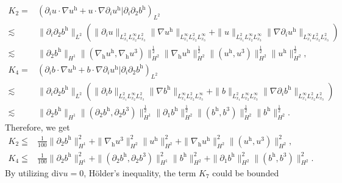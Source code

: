 \documentclass[11pt]{amsart}
\theoremstyle{definition}
\newcommand{\h}{\mathrm{h}}
\newcommand{\nablah}{\nabla_{\mathrm{h}}}
\numberwithin{equation}{section}
\begin{document}
\begin{align}\label{k_2}
	K_2=&\left(\partial_{i}u\cdot \nabla u^\h+u\cdot \nabla\partial_{i} u^\h|\partial_{i}\partial_{2}b^\h\right)_{L^2}\nonumber\\
	\lesssim&\|\partial_{i}\partial_{2}b^\h\|_{L^2}\left(\|\partial_{i}u\|_{L^2_{x_1}L^\infty_{x_2}L^2_{x_3}}\| \nabla u^\h\|_{L^\infty_{x_1}L^{2}_{x_2}L^{\infty}_{x_3}}+\|u\|_{L^2_{x_1}L^\infty_{x_2}L^\infty_{x_3}}\| \nabla\partial_{i} u^\h\|_{L^\infty_{x_1}L^{2}_{x_2}L^{2}_{x_3}}\right)\nonumber\\
	\lesssim&\|\partial_{2}b^\h\|_{H^1}\|(\nablah u^\h,\nablah u^3)\|_{H^2}^\frac12\|\nablah u^\h\|_{H^2}^\frac12\|( u^\h, u^3)\|_{H^2}^\frac12\| u^\h \|_{H^2}^\frac12,\\\label{k_4}
	K_4=&\left(\partial_{i}b\cdot \nabla u^\h+b\cdot \nabla\partial_{i} u^\h|\partial_{i}\partial_{2}b^\h\right)_{L^2}\nonumber\\
	\lesssim&\|\partial_{i}\partial_{2}b^\h\|_{L^2}\left(\|\partial_{i}b\|_{L^2_{x_1}L^\infty_{x_2}L^2_{x_3}}\| \nabla b^\h\|_{L^\infty_{x_1}L^{2}_{x_2}L^{\infty}_{x_3}}+\|b\|_{L^2_{x_1}L^\infty_{x_2}L^\infty_{x_3}}\| \nabla\partial_{i} b^\h\|_{L^\infty_{x_1}L^{2}_{x_2}L^{2}_{x_3}}\right)\nonumber\\
	\lesssim&\|\partial_{2}b^\h\|_{H^1}\|(\partial_2 b^\h,\partial_2 b^3)\|_{H^1}^\frac12\|\partial_1 b^\h\|_{H^2}^\frac12\|( b^\h, b^3)\|_{H^2}^\frac12\| b^\h \|_{H^2}^\frac12.
\end{align}
Therefore, we get
\begin{align}\label{K2}
	K_2	\leqq&\frac{1}{100}\|\partial_{2}b^\h\|_{H^1}^2+\|\nablah u^3\|_{H^2}^2\| u^\h \|_{H^2}^2+\|\nablah u^\h\|_{H^2}^2\|( u^\h, u^3)\|_{H^2}^2,\\\label{K4}
	K_4\leqq&\frac{1}{100}\|\partial_{2}b^\h\|_{H^1}^2+\|(\partial_2 b^\h,\partial_2 b^3)\|_{H^1}^2\| b^\h \|_{H^2}^2+\|\partial_1 b^\h\|_{H^2}^2\|( b^\h, b^3)\|_{H^2}^2.
\end{align}
By utilizing $\mathrm{div}u=0$, H\"older's inequality, the term $K_{7}$ could be bounded
\end{document}
